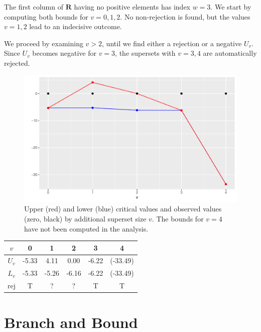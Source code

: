 \documentclass[11pt,a4paper,openright,twoside]{article}
\begin{document}
The first column of $\mathbf{R}$ having no positive elements has index $w=3$. We start by computing both bounds for $v=0,1,2$. No non-rejection is found, but the values $v=1,2$ lead to an indecisive outcome.

We proceed by examining $v>2$, until we find either a rejection or a negative $U_v$. Since $U_v$ becomes negative for $v=3$, the supersets with $v=3,4$ are automatically rejected.

\begin{figure}[h!]
\centering
\includegraphics[scale=0.57]{plot1.pdf}
\caption{Upper (red) and lower (blue) critical values and observed values (zero, black) by additional superset size $v$. The bounds for $v=4$ have not been computed in the analysis.}
\end{figure}


\begin{table}[h!]
\centering
\begin{tabular}{cccccc}
\toprule
$v$ & 0 & 1 & 2 & 3 & 4\\
\midrule
$U_v$ & -5.33 & 4.11 & 0.00 & -6.22 & (-33.49)\\
$L_v$ & -5.33 & -5.26 & -6.16 & -6.22 & (-33.49)\\
\midrule
rej & T & ? & ? & T & T\\
\bottomrule
\end{tabular}
\end{table}


\newpage
\section{Branch and Bound}
\end{document}
